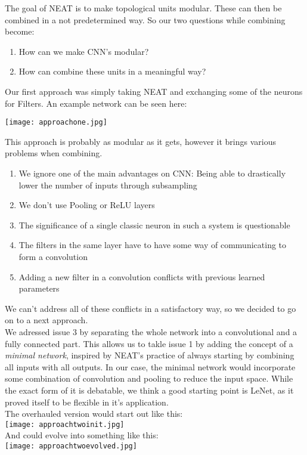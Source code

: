 The goal of NEAT is to make topological units modular.  
These can then be combined in a not predetermined way.  
So our two questions while combining become:  
\begin{enumerate}
	\item{How can we make CNN's modular?}  
	\item{How can combine these units in a meaningful way?}  
\end{enumerate}

Our first approach was simply taking NEAT and exchanging some of the neurons for Filters.  
An example network can be seen here:  

\texttt{[image: approachone.jpg]}  

This approach is probably as modular as it gets, however it brings various problems when combining.  
\begin{enumerate}
	\item{We ignore one of the main advantages on CNN: Being able to drastically lower the number of inputs through subsampling}
	\item{We don't use Pooling or ReLU layers}
	\item{The significance of a single classic neuron in such a system is questionable}
	\item{The filters in the same layer have to have some way of communicating to form a convolution}
	\item{Adding a new filter in a convolution conflicts with previous learned parameters}
\end{enumerate}

We can't address all of these conflicts in a satisfactory way, so we decided to go on to a next approach.
\\
We adressed issue 3 by separating the whole network into a convolutional and a fully connected part. This allows us to takle issue 1 by adding the concept of a \emph{minimal network}, inspired by NEAT's practice of always starting by combining all inputs with all outputs.  
In our case, the minimal network would incorporate some combination of convolution and pooling to reduce the input space. While the exact form of it is debatable, we think a good starting point is LeNet, as it proved itself to be flexible in it's application. \cite{YannLeCun1998}  
\\
The overhauled version would start out like this:  
\\
\texttt{[image: approachtwoinit.jpg]}  
\\
And could evolve into something like this:
\\
\texttt{[image: approachtwoevolved.jpg]}  
\\

